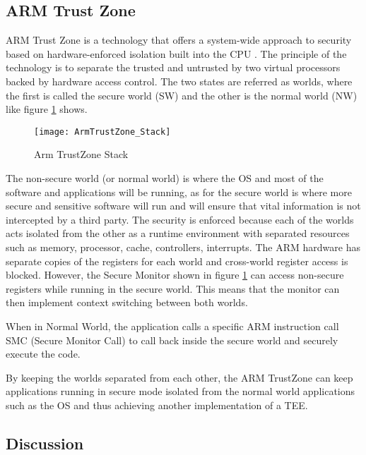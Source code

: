 \subsection{ARM Trust Zone} %
\label{ssec:arm_trust_zone}

ARM Trust Zone \cite{armtrustzone:1} is a technology that offers a system-wide approach to security based on hardware-enforced isolation built into the CPU \cite{armtrustzone:2}. The principle of the technology is to separate the trusted and untrusted by two virtual processors backed by hardware access control. The two states are referred as worlds, where the first is called the secure world (SW) and the other is the normal world (NW) like figure \ref{fig:armtrustzone_stack} shows.

\begin{figure}[htbp]
	\centering
	{\texttt{[image: ArmTrustZone\_Stack]}}%
	\caption{Arm TrustZone Stack \cite{armtrustzone:3}}
	\label{fig:armtrustzone_stack}
\end{figure}

The non-secure world (or normal world) is where the \gls{OS} and most of the software and applications will be running, as for the secure world is where more secure and sensitive software will run and will ensure that vital information is not intercepted by a third party. The security is enforced because each of the worlds acts isolated from the other as a runtime environment with separated resources such as memory, processor, cache, controllers, interrupts. The ARM hardware has separate copies of the registers for each world and cross-world register access is blocked. However, the Secure Monitor shown in figure \ref{fig:armtrustzone_stack} can access non-secure registers while running in the secure world. This means that the monitor can then implement context switching between both worlds.

When in Normal World, the application calls a specific ARM instruction call SMC (Secure Monitor Call) to call back inside the secure world and securely execute the code.

By keeping the worlds separated from each other, the ARM TrustZone can keep applications running in secure mode isolated from the normal world applications such as the OS and thus achieving another implementation of a \gls{TEE}.

\subsection{Discussion}
\label{ssec:s2_discussion}

